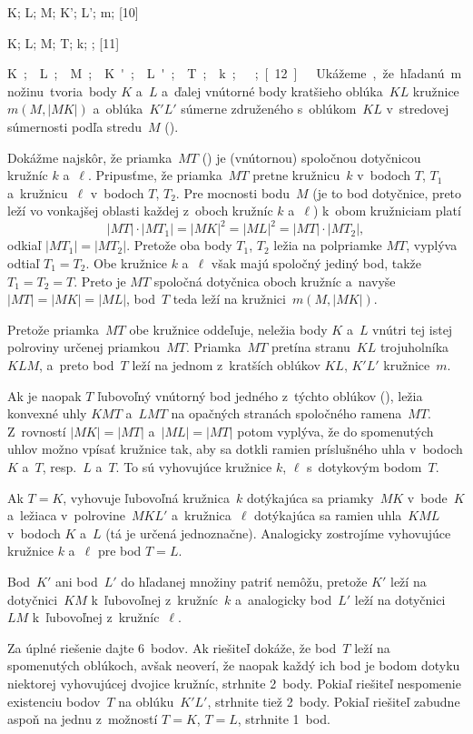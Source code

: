 {%
\fontplace
\rBpoint K; \lBpoint L; \bpoint M; \Blpoint K'; \Brpoint L';
\lpoint m;
[10] \hfil\Obr

\fontplace
\rpoint K; \lpoint L; \bpoint M; \rpoint T;
\tpoint k; \tpoint \ell;
[11] \hfil\Obr

\fontplace
\rpoint\down\unit K; \lBpoint L; \tpoint M; \lBpoint K'; \rBpoint L';
\blpoint T; \rpoint k; \lpoint \ell;
[12] \hfil\Obr

Ukážeme, že hľadanú množinu tvoria body $K$ a~$L$ a~ďalej vnútorné
body kratšieho oblúka~$KL$ kružnice $m(M,|MK|)$ a~oblúka~$K'L'$
súmerne združeného s~oblúkom~$KL$ v~stredovej súmernosti podľa stredu~$M$ (\obr).

\inspicture{}

Dokážme najskôr, že priamka~$MT$ (\obr) je (vnútornou) spoločnou dotyčnicou
kružníc $k$ a~$\ell$.
\inspicture{}
Pripusťme, že priamka~$MT$ pretne
kružnicu~$k$ v~bodoch $T$, $T_1$ a~kružnicu~$\ell$ v~bodoch $T$,
$T_2$. Pre mocnosti bodu~$M$ (je to bod dotyčnice, preto leží vo
vonkajšej oblasti každej z~oboch kružníc $k$ a~$\ell$) k~obom kružniciam platí
$$
|MT|\cdot|MT_1|=|MK|^2=|ML|^2=|MT|\cdot|MT_2|,
$$
odkiaľ $|MT_1|=|MT_2|$. Pretože oba body $T_1$, $T_2$ ležia na
polpriamke $MT$, vyplýva odtiaľ $T_1=T_2$. Obe kružnice $k$ a~$\ell$
však majú spoločný jediný bod, takže $T_1=T_2=T$. Preto je $MT$
spoločná dotyčnica oboch kružníc a~navyše $|MT|=|MK|=|ML|$, bod~$T$
teda leží na kružnici~$m(M,|MK|)$.

Pretože priamka~$MT$ obe kružnice oddeľuje, neležia body $K$ a~$L$
vnútri tej istej polroviny určenej priamkou~$MT$. Priamka~$MT$ pretína
stranu~$KL$ trojuholníka~$KLM$, a~preto bod~$T$ leží na jednom
z~kratších oblúkov $KL$, $K'L'$ kružnice~$m$.

Ak je naopak $T$ ľubovoľný vnútorný bod jedného z~týchto oblúkov
(\obr), ležia konvexné uhly $KMT$ a~$LMT$ na opačných
stranách spoločného ramena~$MT$. Z~rovností $|MK|=|MT|$
a~$|ML|=|MT|$ potom vyplýva, že do spomenutých uhlov možno vpísať kružnice
tak, aby sa dotkli ramien príslušného uhla v~bodoch $K$ a~$T$,
resp.~$L$ a~$T$. To sú vyhovujúce kružnice $k$, $\ell$ s~dotykovým
bodom~$T$.

\inspicture{}

Ak $T=K$, vyhovuje ľubovoľná kružnica~$k$ dotýkajúca sa priamky~$MK$
v~bode~$K$ a~ležiaca v~polrovine~$MKL'$ a~kružnica~$\ell$
dotýkajúca sa ramien uhla~$KML$ v~bodoch $K$ a~$L$ (tá je určená
jednoznačne). Analogicky zostrojíme vyhovujúce kružnice $k$ a~$\ell$
pre bod $T=L$.

Bod~$K'$ ani bod~$L'$ do hľadanej množiny patriť nemôžu, pretože
$K'$ leží na dotyčnici~$KM$ k~ľubovoľnej z~kružníc~$k$ a~analogicky
bod~$L'$ leží na dotyčnici~$LM$ k~ľubovoľnej z~kružníc~$\ell$.

\nobreak\medskip\petit\noindent
Za úplné riešenie dajte 6~bodov. Ak riešiteľ dokáže, že bod~$T$
leží na spomenutých oblúkoch, avšak neoverí, že naopak každý
ich bod je bodom dotyku niektorej vyhovujúcej dvojice kružníc,
strhnite 2~body. Pokiaľ riešiteľ nespomenie existenciu bodov~$T$ na
oblúku~$K'L'$, strhnite tiež 2~body. Pokiaľ riešiteľ zabudne
aspoň na jednu z~možností $T=K$, $T=L$, strhnite 1~bod.
\endpetit
\bigbreak}

